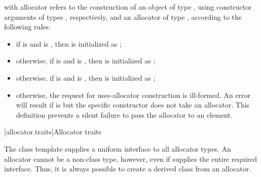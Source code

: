 \pnum
{} with allocator  refers to the
construction of an object  of type , using constructor arguments
 of types , respectively, and an allocator
 of type , according to the following rules:

\begin{itemize}
\item if  is  and
 is , then  is
initialized as ;

\item otherwise, if  is  and
  is
, then  is initialized as ;

\item otherwise, if  is  and
 is , then
 is initialized as ;

\item otherwise, the request for uses-allocator construction is ill-formed. \enternote
An error will result if  is  but the
specific constructor does not take an allocator. This definition prevents a silent
failure to pass the allocator to an element. \exitnote
\end{itemize}

[allocator.traits]{Allocator traits}

\pnum
The class template  supplies a uniform interface to all
allocator types.
An allocator cannot be a non-class type, however, even if 
supplies the entire required interface. \enternote Thus, it is always possible to create
a derived class from an allocator. \exitnote

